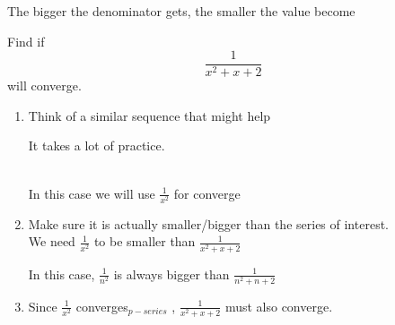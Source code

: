 	\begin{theorem}{}{}
	\label{comparison_test}
	The bigger the denominator gets, the smaller the value become
	\end{theorem}
	
	 
	\begin{simple}{}{}
	Find if
	$$\frac{1}{x^2+x+2}$$
	will converge.
	
	\begin{enumerate}
	\item Think of a similar sequence that might help
	\begin{tiny}
	It takes a lot of practice.
	\end{tiny}\\
	In this case we will use $\frac{1}{x^2}$ for converge
	
	\item Make sure it is actually smaller/bigger than the series of interest.\\
	We need $\frac{1}{x^2}$ to be smaller than $\frac{1}{x^2+x+2}$
	
	\begin{center}
	\end{center}
	
	In this case, $\frac{1}{n^2}$ is always bigger than $\frac{1}{n^2+n+2}$
	
	\item Since $\frac{1}{x^2}$ converges$_{p-series}$
	, $\frac{1}{x^2+x+2}$ must also converge.
	\end{enumerate}
	\end{simple}
	
